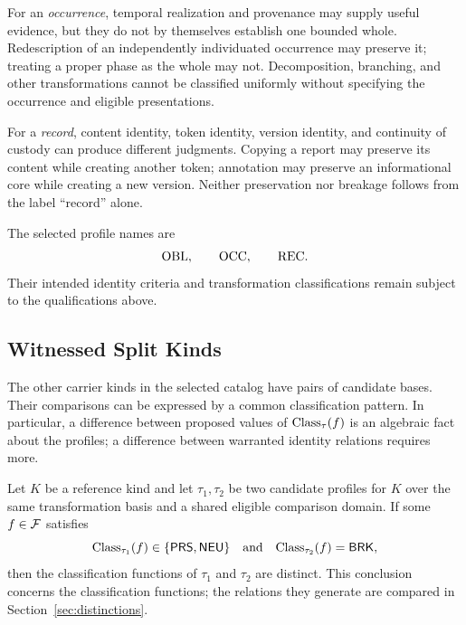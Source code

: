 For an \emph{occurrence}, temporal realization and provenance may supply
useful evidence, but they do not by themselves establish one bounded
whole.
Redescription of an independently individuated occurrence may
preserve it; treating a proper phase as the whole may not.
Decomposition, branching, and other transformations
cannot be classified uniformly without specifying
the occurrence and eligible presentations.

For a \emph{record}, content identity, token identity, version identity,
and continuity of custody can produce different judgments.
Copying a report may preserve its content while creating another token;
annotation may preserve an informational core while creating a new version.
Neither preservation nor breakage follows from the label ``record'' alone.

The selected profile names are
\[
  \mathrm{OBL},\qquad \mathrm{OCC},\qquad \mathrm{REC}.
\]
Their intended identity criteria and transformation classifications
remain subject to the qualifications above.

\subsection{Witnessed Split Kinds}
\label{subsec:witnessed_split_kinds}

The other carrier kinds in the selected catalog have pairs of
candidate bases.
Their comparisons can be expressed by a common
classification pattern.
In particular, a difference between proposed
values of $\mathrm{Class}_\tau(f)$ is an algebraic fact about the profiles;
a difference between warranted identity relations requires more.

\begin{lemma}
  \label{se200.lem.SplitPattern}
  Let $K$ be a reference kind and let $\tau_1,\tau_2$ be two candidate
  profiles for $K$ over the same transformation basis and a shared
  eligible comparison domain.
  If some $f\in\mathcal{F}$ satisfies
  \[
    \mathrm{Class}_{\tau_1}(f)\in\{\textsf{PRS},\textsf{NEU}\}
    \quad\text{and}\quad
    \mathrm{Class}_{\tau_2}(f)=\textsf{BRK},
  \]
  then the classification functions of $\tau_1$ and $\tau_2$
  are distinct.
  This conclusion concerns the classification functions; the relations
  they generate are compared in Section~\ref{sec:distinctions}.
\end{lemma}

